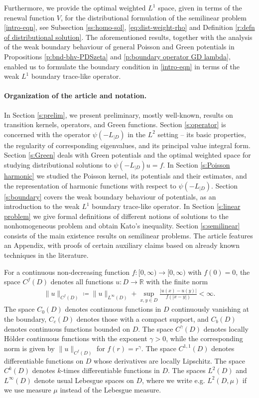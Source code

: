 \documentclass[12pt,a4paper,onecolumn]{article}
\theoremstyle{definition}
\newcommand{\R}{\mathbb{R}}
\newcommand{\1}{\mathbf 1}
\newcommand{\Lo}{\psi(-L_{|D})}
\numberwithin{equation}{section}
\begin{document}
        Furthermore, we provide the optimal weighted $L^1$ space, given in terms of the renewal function $V$, for the distributional formulation of the semilinear problem \eqref{intro-eqn}, see Subsection \ref{ss:homo-sol}, \eqref{eq:dist-weight-rho} and Definition \ref{r:defn of distributional solution}. The aforementioned results, together with the analysis of the weak boundary behaviour of general Poisson and Green potentials in Propositions \ref{p:bnd-bhv-PDSzeta} and \ref{p:boundary operator GD lambda}, enabled us to formulate the boundary condition in \eqref{intro-eqn} in terms of the weak $L^1$ boundary trace-like operator.    

    \paragraph*{Organization of the article and notation.}
    In Section \ref{s:prelim}, we present preliminary, mostly well-known, results on transition kernels, operators, and Green functions. Section \ref{s:operator} is concerned with the operator $\Lo$ in the $L^2$ setting -- its basic properties, the regularity of corresponding eigenvalues, and its principal value integral form. Section \ref{s:Green} deals with Green potentials and the optimal weighted space for studying distributional solutions to $\Lo u=f$. In Section \ref{s:Poisson harmonic} we studied the Poisson kernel, its potentials and their estimates, and the representation of harmonic functions with respect to $\Lo$. Section \ref{s:boundary} covers the weak boundary behaviour of potentials, as an introduction to the weak $L^1$ boundary trace-like operator. In Section \ref{s:linear problem} we give formal definitions of different notions of solutions to the nonhomogeneous problem and obtain Kato's inequality. Section \ref{s:semilinear} consists of the main existence results on semilinear problems. The article features an Appendix, with proofs of certain auxiliary claims based on already known techniques in the literature.
    	
	 For a continuous non-decreasing function $f:[0,\infty)\to [0,\infty)$ with $f(0)=0$, the space $C^f(D)$ denotes all functions $u:D\to \R$ with the finite norm
		\begin{align*}
			\|u\|_{C^f(D)}\coloneqq \| u\|_{L^\infty(D)}+\sup_{x,y\in D}\frac{|u(x)-u(y)|}{f(|x-y|)}<\infty.
		\end{align*}
		The space $C_0(D)$ denotes continuous functions in $D$ continuously vanishing at the boundary, $C_c(D)$ denotes those with a compact support, and $C_b(D)$ denotes continuous functions bounded on $D$. The space $C^\gamma(D)$ denotes locally H\"older continuous functions with the exponent $\gamma>0$, while the corresponding norm is given by $\|u\|_{C^f(D)}$ for $f(r)=r^\gamma$. The space $C^{1,1}(D)$ denotes differentiable functions on $D$ whose derivatives are locally Lipschitz. The space $C^k(D)$ denotes $k$-times differentiable functions in $D$. The spaces $L^2(D)$ and $L^\infty(D)$ denote usual Lebesgue spaces on $D$, where we write e.g. $L^2(D,\mu)$ if we use measure $\mu$ instead of the Lebesgue measure.
        
\end{document}
